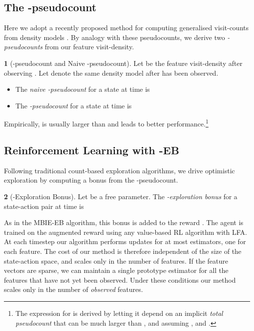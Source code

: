 \documentclass{article}
\theoremstyle{definition}
\newtheorem{defn}{\protect\definitionname}
\theoremstyle{definition}
\theoremstyle{plain}
\theoremstyle{plain}
\theoremstyle{plain}
\providecommand{\definitionname}{Definition}
\begin{document}
\subsection{The -pseudocount}

Here we adopt a recently proposed method for computing generalised
visit-counts from density models \cite{Bellemare2016,DBLP:journals/corr/OstrovskiBOM17}.
By analogy with these pseudocounts, we derive two \emph{-pseudocounts}
from our feature visit-density. 
\begin{defn}
[-pseudocount and Naive -pseudocount]\label{def:pseudocount}
Let  be the feature visit-density after observing
. Let  denote the same density
model after  has been observed.\end{defn}
\begin{itemize}
\item The \emph{naive -pseudocount} \emph{}
for a state  at time  is


\item The \emph{-pseudocount }\emph{ }for
a state  at time  is 


\end{itemize}
Empirically,  is usually larger than \emph{}
and leads to better performance.\footnote{The expression for  is derived by letting
it depend on an implicit \emph{total pseudocount } that
can be much larger than , and assuming ,
and 
\cite{Bellemare2016}.} 


\subsection{Reinforcement Learning with -EB}

\begin{algorithm}
\begin{algorithmic}
\Require{, }
\While{}
\EndFor
{}
\EndWhile
\State{}
\Return{}
\end{algorithmic}

\caption{Reinforcement Learning with LFA and -EB.\label{alg:Reinforcement-learning-with}}
\end{algorithm}
\label{alg:RLPHIEB}Following traditional count-based exploration
algorithms, we drive optimistic exploration by computing a bonus from
the -pseudocount.
\begin{defn}
[-Exploration Bonus] Let  be a free parameter.
The \emph{-exploration bonus }for a state-action pair 
at time  is


\end{defn}
As in the MBIE-EB algorithm, this bonus is added to the reward .
The agent is trained on the augmented reward 
using any value-based RL algorithm with LFA. At each timestep our
algorithm performs updates for at most  estimators, one for each
feature. The cost of our method is therefore independent of the size
of the state-action space, and scales only in the number of features.
If the feature vectors are sparse, we can maintain a single prototype
estimator for all the features that have not yet been observed. Under
these conditions our method scales only in the number of \emph{observed
}features.
\end{document}
